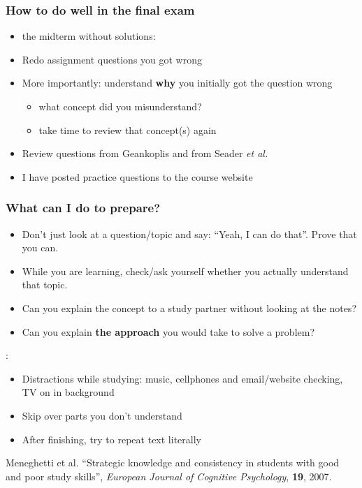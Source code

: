 \begin{frame}\frametitle{How to do well in the final exam}
	\begin{itemize}
		\item	{\color{myRed}{Repeat}} the midterm without solutions: \emph{{\color{myOrange}{it should be easy now}}}
		\item	Redo assignment questions you got wrong
		\item	More importantly: understand \textbf{why} you initially got the question wrong
			\begin{itemize}
				\item	what concept did you misunderstand?
				\item	take time to review that concept(s) again
			\end{itemize}
		\item	Review questions from Geankoplis and from Seader \emph{et al.}
		\item	I have posted practice questions to the course website
	\end{itemize}
\end{frame}

\begin{frame}\frametitle{What can I do to prepare?}
	\textbf{{}}
	\begin{itemize}
		\item	Don't just look at a question/topic and say: ``Yeah, I can do that''. Prove that you can.
		\item	While you are learning, check/ask yourself whether you actually understand that topic.
		\item	Can you explain the concept to a study partner without looking at the notes?
		\item	Can you explain \textbf{the approach} you would take to solve a problem?
	\end{itemize}
	\textbf{{\color{myRed}{Poor students do this*}}}:
	\begin{itemize}
		\item	Distractions while studying: music, cellphones and email/website checking, TV on in background
		\item	Skip over parts you don't understand
		\item	After finishing, try to repeat text literally
	\end{itemize}
	\textbf{{\color{myRed}{*}}}{\tiny Meneghetti et al. ``Strategic knowledge and consistency in students with good and poor study skills'', \emph{European Journal of Cognitive Psychology}, \textbf{19}, 2007.}
\end{frame}

